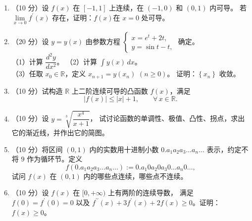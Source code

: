 \begin{enumerate}
\item[二]（10 分）设 $f(x)$ 在 $[-1,1]$ 上连续，在 $(-1,0)$ 和 $(0,1)$ 内可导。
若 $\lim\limits_{x \rightarrow 0} f^{\prime}(x)$ 存在，证明：$f(x)$在 $x=0$ 处可导。

\item[三]（20 分）设 $y=y(x)$ 由参数方程 $\begin{cases}x=e^{t}+2 t, \\ y=\sin t-t,\end{cases}$ 确定。\\
（1）计算 $\dfrac{d^{2}y}{dx^{2}}$。\qquad\qquad
（2）计算 $\displaystyle\int y(x) \, dx$。\\
（3）任取 $x_{0} \in \mathbb{R}$，定义 $x_{n+1}=y(x_{n})$ $(n \geq 0)$。
证明：$\left\{x_{n}\right\}$ 收敛。

\item[四]（10 分）试构造 $\mathbb{R}$ 上二阶连续可导的凸函数 $f(x)$，满足
$$|f(x)| \leq |x|+1, \qquad \forall\, x \in \mathbb{R}.$$

\item[五]（10 分）设 $y=\sqrt[3]{\dfrac{x^{4}}{x+1}}$，
试讨论函数的单调性、极值、凸性、拐点，求出它的渐近线，并作出它的简图。

\item[六]（10 分）将区间 $(0,1)$ 内的实数用十进制小数 $0.a_{1}a_{2}a_{3} \ldots a_{n} \ldots$ 表示，约定不将 $9$ 作为循环节。定义
$$f(0.a_{1}a_{2}a_{3}\ldots a_{n}\ldots)
:=0.a_{1}0a_{2}0a_{3}0\ldots a_{n}0\ldots,$$
试问 $f(x)$ 在 $(0,1)$ 内的哪些点连续，哪些点不连续。

\item[七]（10 分）设 $f(x)$ 在 $[0,+\infty)$ 上有两阶的连续导数，
满足 $f(0)=f^{\prime}(0)=0$ 以及 $f^{\prime \prime}(x)+3 f^{\prime}(x)+2 f(x) \geq 0$。证明：$f(x) \geq 0$。
\end{enumerate}

